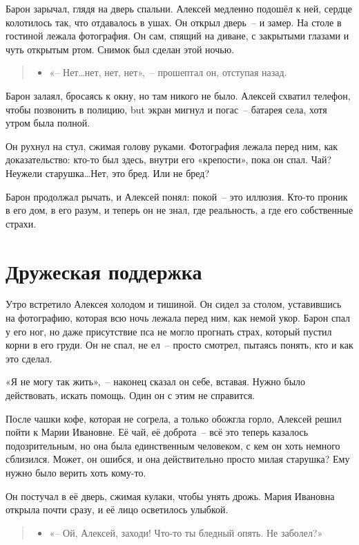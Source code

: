 \documentclass[12pt,a4paper]{book}
\newenvironment{dialogue}{\begin{quote}\itshape\begin{itemize}\item[]}{\end{itemize}\end{quote}}
\begin{document}
Барон зарычал, глядя на дверь спальни. Алексей медленно подошёл к ней, сердце колотилось так, что отдавалось в ушах. Он открыл дверь~-- и замер. На столе в гостиной лежала фотография. Он сам, спящий на диване, с закрытыми глазами и чуть открытым ртом. Снимок был сделан этой ночью.

\begin{dialogue}
«-- Нет\ldots нет, нет, нет»,~-- прошептал он, отступая назад.
\end{dialogue}

Барон залаял, бросаясь к окну, но там никого не было. Алексей схватил телефон, чтобы позвонить в полицию, but экран мигнул и погас~-- батарея села, хотя утром была полной.

Он рухнул на стул, сжимая голову руками. Фотография лежала перед ним, как доказательство: кто-то был здесь, внутри его «крепости», пока он спал. Чай? Неужели старушка\ldots Нет, это бред. Или не бред?

Барон продолжал рычать, и Алексей понял: покой~-- это иллюзия. Кто-то проник в его дом, в его разум, и теперь он не знал, где реальность, а где его собственные страхи.

\chapter{Дружеская поддержка}

Утро встретило Алексея холодом и тишиной. Он сидел за столом, уставившись на фотографию, которая всю ночь лежала перед ним, как немой укор. Барон спал у его ног, но даже присутствие пса не могло прогнать страх, который пустил корни в его груди. Он не спал, не ел~-- просто смотрел, пытаясь понять, кто и как это сделал.

«Я не могу так жить»,~-- наконец сказал он себе, вставая. Нужно было действовать, искать помощь. Один он с этим не справится.

После чашки кофе, которая не согрела, а только обожгла горло, Алексей решил пойти к Марии Ивановне. Её чай, её доброта~-- всё это теперь казалось подозрительным, но она была единственным человеком, с кем он хоть немного сблизился. Может, он ошибся, и она действительно просто милая старушка? Ему нужно было верить хоть кому-то.

Он постучал в её дверь, сжимая кулаки, чтобы унять дрожь. Мария Ивановна открыла почти сразу, и её лицо осветилось улыбкой.

\begin{dialogue}
«-- Ой, Алексей, заходи! Что-то ты бледный опять. Не заболел?»
\end{dialogue}
\end{document}
